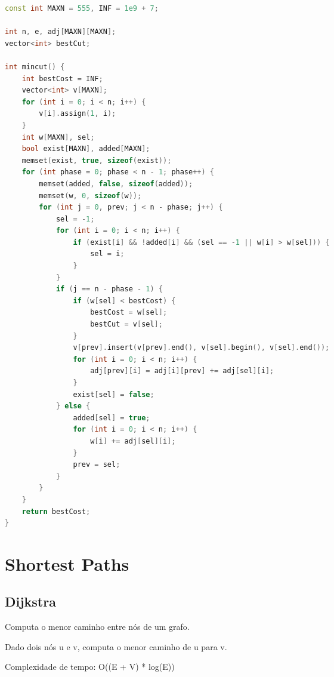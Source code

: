 \documentclass[11pt, a4paper, oneside]{book}
\begin{document}
\begin{multicols}{2}
\begin{lstlisting}[language=C++]
const int MAXN = 555, INF = 1e9 + 7;

int n, e, adj[MAXN][MAXN];
vector<int> bestCut;

int mincut() {
    int bestCost = INF;
    vector<int> v[MAXN];
    for (int i = 0; i < n; i++) {
        v[i].assign(1, i);
    }
    int w[MAXN], sel;
    bool exist[MAXN], added[MAXN];
    memset(exist, true, sizeof(exist));
    for (int phase = 0; phase < n - 1; phase++) {
        memset(added, false, sizeof(added));
        memset(w, 0, sizeof(w));
        for (int j = 0, prev; j < n - phase; j++) {
            sel = -1;
            for (int i = 0; i < n; i++) {
                if (exist[i] && !added[i] && (sel == -1 || w[i] > w[sel])) {
                    sel = i;
                }
            }
            if (j == n - phase - 1) {
                if (w[sel] < bestCost) {
                    bestCost = w[sel];
                    bestCut = v[sel];
                }
                v[prev].insert(v[prev].end(), v[sel].begin(), v[sel].end());
                for (int i = 0; i < n; i++) {
                    adj[prev][i] = adj[i][prev] += adj[sel][i];
                }
                exist[sel] = false;
            } else {
                added[sel] = true;
                for (int i = 0; i < n; i++) {
                    w[i] += adj[sel][i];
                }
                prev = sel;
            }
        }
    }
    return bestCost;
}\end{lstlisting}
\end{multicols}

\hfill

\section{Shortest Paths}
\subsection{Dijkstra}


Computa o menor caminho entre nós de um grafo.



\textbf{} 


Dado dois nós u e v, computa o menor caminho de u para v.



Complexidade de tempo: O((E + V) * log(E))
\end{document}
